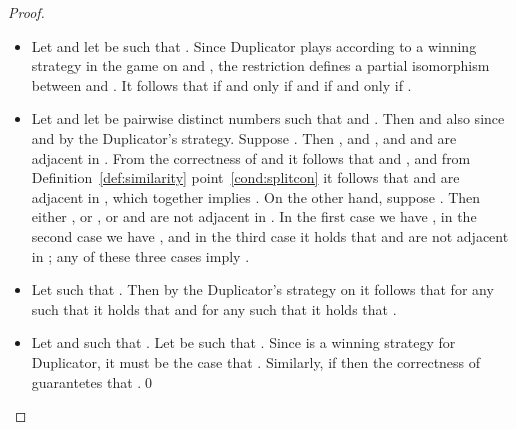 \documentclass{llncs}
\begin{document}
{\begin{proof}
\begin{itemize}
    \item Let  and let  be such that . Since
      Duplicator plays according to a winning strategy  in the game on 
      and , the restriction  defines a partial
      isomorphism between  and . It follows that  if
      and only if  and  if and
      only if .  
    
      \item Let  and let  be pairwise distinct numbers such that  and . Then  and also  since  and  by the Duplicator's strategy. Suppose . Then , and , and  and  are adjacent in . From the correctness of  and  it follows that  and , and from Definition~\ref{def:similarity} point~\ref{cond:splitcon} it follows that  and  are adjacent in , which together implies  . On the other hand, suppose . Then either , or , or  and  are not adjacent in . In the first case we have , in the second case we have , and in the third case it holds that  and  are not adjacent in ; any of these three cases imply .
    
    \item Let  such that . Then by the Duplicator's strategy on  it follows that for any  such that  it holds that  and for any  such that  it holds that .
    
    \item Let  and  such that . Let  be such that . Since  is a winning strategy for Duplicator, it must be the case that . Similarly, if  then the correctness of  guarantetes that .\qed
  \end{itemize}
\end{proof}}

\lv{\pflempartitiongame}


\end{document}
